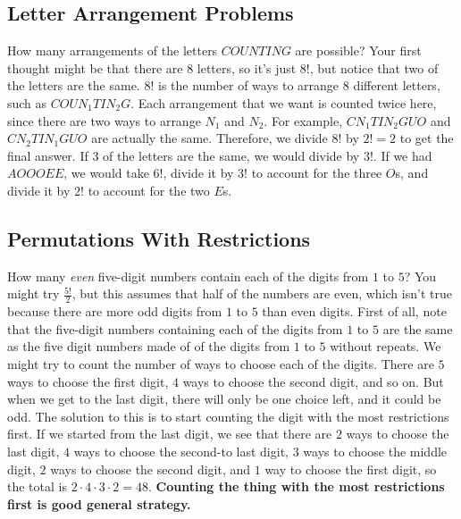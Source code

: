 \documentclass[twocolumn]{article}
\begin{document}
\subsection*{Letter Arrangement Problems}
How many arrangements of the letters $COUNTING$ are possible? Your first thought 
might be that there are $8$ letters, so it's just $8!$, but notice that two of 
the letters are the same. $8!$ is the number of ways to arrange $8$ different 
letters, such as $COUN_1 TIN_2 G$. Each arrangement that we want is counted 
twice here, since there are two ways to arrange $N_1$ and $N_2$. For example, 
$CN_1 TIN_2 GUO$ and $CN_2 TIN_1 GUO$ are actually the same. Therefore, we 
divide $8!$ by $2! = 2$ to get the final answer. If $3$ of the letters are the 
same, we would divide by $3!$. If we had $AOOOEE$, we would take $6!$, divide it 
by $3!$ to account for the three $O$s, and divide it by $2!$ to account for the 
two $E$s.

\subsection*{Permutations With Restrictions}
How many \emph{even} five-digit numbers contain each of the digits from $1$ to 
$5$? You might try $\frac{5!}{2}$, but this assumes that half of the numbers are 
even, which isn't true because there are more odd digits from $1$ to $5$ than 
even digits. First of all, note that the five-digit numbers containing each of 
the digits from $1$ to $5$ are the same as the five digit numbers made of of the 
digits from $1$ to $5$ without repeats. We might try to count the number of ways 
to choose each of the digits. There are $5$ ways to choose the first digit, $4$ 
ways to choose the second digit, and so on. But when we get to the last digit, 
there will only be one choice left, and it could be odd. The solution to this is 
to start counting the digit with the most restrictions first. If we started from 
the last digit, we see that there are $2$ ways to choose the last digit, $4$ 
ways to choose the second-to last digit, $3$ ways to choose the middle digit, 
$2$ ways to choose the second digit, and $1$ way to choose the first digit, so 
the total is $2 \cdot 4 \cdot 3 \cdot 2 = 48$. \textbf{Counting the thing with 
the most restrictions first is good general strategy.}
\end{document}
